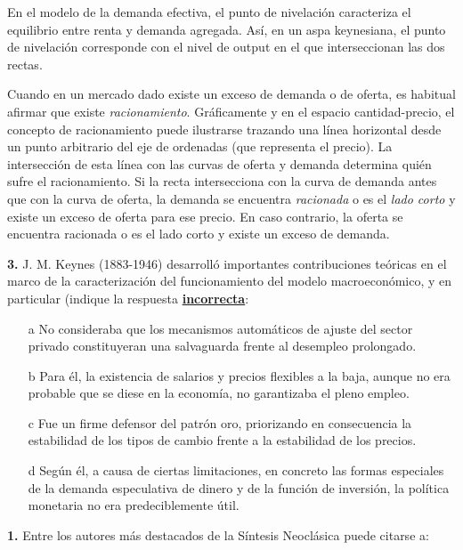 \documentclass{nuevotema}
\begin{document}
En el modelo de la demanda efectiva, el punto de nivelación caracteriza el equilibrio entre renta y demanda agregada. Así, en un aspa keynesiana, el punto de nivelación corresponde con el nivel de output en el que interseccionan las dos rectas.


Cuando en un mercado dado existe un exceso de demanda o de oferta, es habitual afirmar que existe \textit{racionamiento}. Gráficamente y en el espacio cantidad-precio, el concepto de racionamiento puede ilustrarse trazando una línea horizontal desde un punto arbitrario del eje de ordenadas (que representa el precio). La intersección de esta línea con las curvas de oferta y demanda determina quién sufre el racionamiento. Si la recta intersecciona con la curva de demanda antes que con la curva de oferta, la demanda se encuentra \textit{racionada} o es el \textit{lado corto} y existe un exceso de oferta para ese precio. En caso contrario, la oferta se encuentra racionada o es el lado corto y existe un exceso de demanda.


\preguntas


\textbf{3.} J. M. Keynes (1883-1946) desarrolló importantes contribuciones teóricas en el marco de la caracterización del funcionamiento del modelo macroeconómico, y en particular (indique la respuesta \underline{\textbf{incorrecta}}:

\begin{itemize}
	\item[a] No consideraba que los mecanismos automáticos de ajuste del sector privado constituyeran una salvaguarda frente al desempleo prolongado.
	\item[b] Para él, la existencia de salarios y precios flexibles a la baja, aunque no era probable que se diese en la economía, no garantizaba el pleno empleo.
	\item[c] Fue un firme defensor del patrón oro, priorizando en consecuencia la estabilidad de los tipos de cambio frente a la estabilidad de los precios.
	\item[d] Según él, a causa de ciertas limitaciones, en concreto las formas especiales de la demanda especulativa de dinero y de la función de inversión, la política monetaria no era predeciblemente útil.
\end{itemize}


\textbf{1.} Entre los autores más destacados de la Síntesis Neoclásica puede citarse a:
\end{document}
